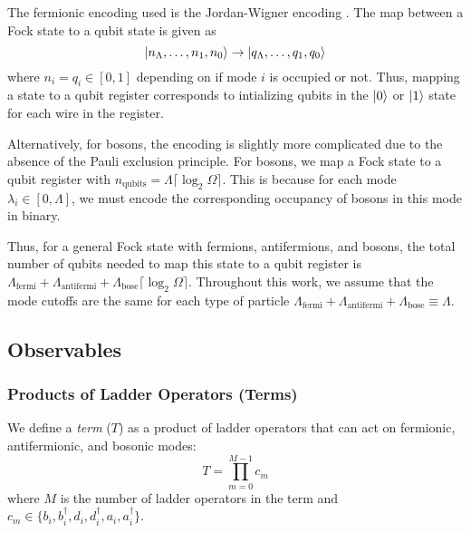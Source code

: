 The fermionic encoding used is the Jordan-Wigner encoding \cite{jordan-wigner}. The map between a Fock state to a qubit state is given as 
\begin{equation}
    \ket{n_\Lambda, \dots, n_1, n_0} \rightarrow \ket{q_\Lambda, \dots, q_1, q_0}
\end{equation}
where $n_i = q_i \in [0, 1]$ depending on if mode $i$ is occupied or not. Thus, mapping a state to a qubit register corresponds to intializing qubits in the $\ket{0}$ or $\ket{1}$ state for each wire in the register. 

Alternatively, for bosons, the encoding is slightly more complicated due to the absence of the Pauli exclusion principle. For bosons, we map a Fock state to a qubit register with $n_{\text{qubits}} = \Lambda \lceil \log_2{\Omega}\rceil$.
This is because for each mode $\lambda_i \in [0, \Lambda]$, we must encode the corresponding occupancy of bosons in this mode in binary. 

Thus, for a general Fock state with fermions, antifermions, and bosons, the total number of qubits needed to map this state to a qubit register is $\Lambda_{\text{fermi}} + \Lambda_{\text{antifermi}} + \Lambda_{\text{bose}} \lceil \log_2{\Omega}\rceil$.
Throughout this work, we assume that the mode cutoffs are the same for each type of particle $\Lambda_{\text{fermi}} + \Lambda_{\text{antifermi}} + \Lambda_{\text{bose}} \equiv \Lambda$.






\subsection{Observables}
\label{subsec:observables}

\subsubsection{Products of Ladder Operators (Terms)}

We define a \textit{term} ($T$) as a product of ladder operators that can act on fermionic, antifermionic, and bosonic modes:
\begin{equation}
    T = \prod_{m=0}^{M-1} c_m
\end{equation}
where $M$ is the number of ladder operators in the term and $c_m \in \{b_i, b_i^\dagger, d_i, d_i^\dagger, a_i, a_i^\dagger\}$.

